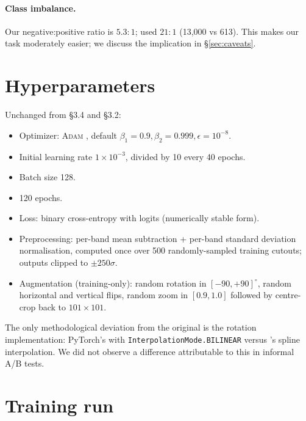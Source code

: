 \documentclass[11pt,letterpaper]{article}
\newcommand{\Adam}{\textsc{Adam}}
\begin{document}
\paragraph{Class imbalance.} Our negative:positive ratio is $5.3{:}1$;
\textcite{huang2020decals} used $21{:}1$ (13{,}000 vs 613). This makes
our task moderately easier; we discuss the implication in
\S\ref{sec:caveats}.

\section{Hyperparameters}

Unchanged from \textcite{lanusse2018cmu} \S3.4 and \textcite{huang2020decals}
\S3.2:

\begin{itemize}
\item Optimizer: \Adam{} \autocite{kingma2015adam}, default
      $\beta_1=0.9, \beta_2=0.999, \epsilon=10^{-8}$.
\item Initial learning rate $1\times10^{-3}$, divided by 10 every 40
      epochs.
\item Batch size 128.
\item 120 epochs.
\item Loss: binary cross-entropy with logits (numerically stable form).
\item Preprocessing: per-band mean subtraction + per-band standard
      deviation normalisation, computed once over 500 randomly-sampled
      training cutouts; outputs clipped to $\pm 250\sigma$.
\item Augmentation (training-only): random rotation in $[-90, +90]^\circ$,
      random horizontal and vertical flips, random zoom in $[0.9, 1.0]$
      followed by centre-crop back to $101\times101$.
\end{itemize}

The only methodological deviation from the original is the rotation
implementation: PyTorch's 
with \texttt{InterpolationMode.BILINEAR} versus \textcite{lanusse2018cmu}'s
spline interpolation. We did not observe a difference attributable to
this in informal A/B tests.

\section{Training run}
\end{document}
